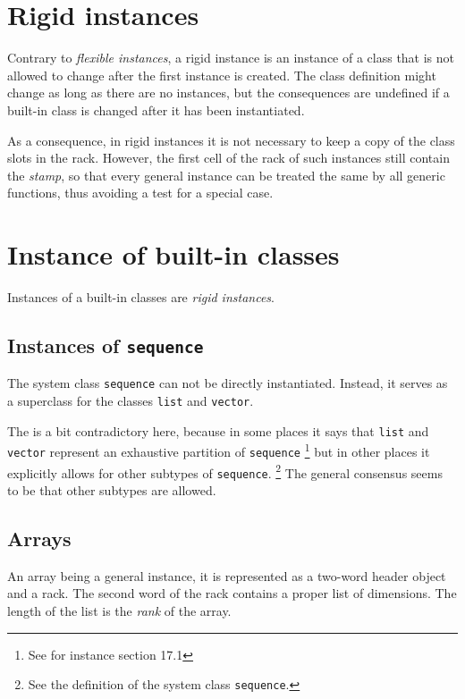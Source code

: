 \section{Rigid instances}
\label{sec-data-representation-rigid-instances}

Contrary to \emph{flexible instances}, a rigid instance is an instance
of a class that is not allowed to change after the first instance is
created.  The class definition might change as long as there are
no instances, but the consequences are undefined if a built-in class
is changed after it has been instantiated.

As a consequence, in rigid instances it is not necessary to keep a
copy of the class slots in the rack.  However, the first
cell of the rack of such instances still contain the
\emph{stamp}, so that every general instance can be treated the same
by all generic functions, thus avoiding a test for a special case.

\section{Instance of built-in classes}

Instances of a built-in classes are \emph{rigid instances}.

\subsection{Instances of \texttt{sequence}}

The system class \texttt{sequence} can not be directly instantiated.
Instead, it serves as a superclass for the classes \texttt{list} and
\texttt{vector}.

The \hs{} is a bit contradictory here, because
in some places it says that \texttt{list} and \texttt{vector}
represent an exhaustive partition of \texttt{sequence}%
\footnote{See for instance section 17.1}
but in other places it explicitly allows for other subtypes of
\texttt{sequence}.%
\footnote{See the definition of the system class \texttt{sequence}.}
The general consensus seems to be that other subtypes are allowed.


\subsection{Arrays}
\label{sec-data-representation-arrays}

An array being a general instance, it is represented as a two-word
header object and a rack.  The second word of the rack
contains a proper list of dimensions.  The length of the list
is the \emph{rank} of the array.

